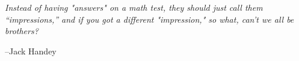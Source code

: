\documentclass[fleqn,addpoints]{exam}
\begin{document}
\ifprintanswers
\else
\vspace{9 cm}

{\em Instead of having "answers" on a math test, they should just call them ``impressions,'' and if you got a different
  "impression," so what, can't we all be brothers?}

\vspace{0.1 in}
\hspace{0.5 in} --Jack Handey



\fi
\end{document}
